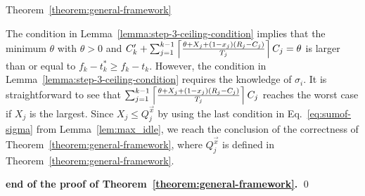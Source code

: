 \begin{appProof}{Theorem~\ref{theorem:general-framework}}

The condition in Lemma~\ref{lemma:step-3-ceiling-condition} implies that the minimum $\theta$ with $\theta > 0$ and
$C_k'+\sum_{j=1}^{k-1} \left\lceil{\frac{\theta+X_j+(1-x_j)(R_j-C_j)}{T_j}}\right\rceil C_j = \theta$
 is larger than or equal to $f_k-t_k^* \geq f_k-t_k$. 
However, the condition in Lemma~\ref{lemma:step-3-ceiling-condition} requires the knowledge of $\sigma_i$. It is straightforward to see that $\sum_{j=1}^{k-1} \left\lceil{\frac{\theta+X_j+(1-x_j)(R_j-C_j)}{T_j}}\right\rceil C_j$ reaches the worst case if $X_j$ is the largest. Since $X_j \leq Q_j^{\vec{x}}$ by using the last condition in Eq.~\eqref{eq:sumof-sigma} from Lemma~\ref{lem:max_idle}, we reach the conclusion of the correctness of Theorem~\ref{theorem:general-framework}, where  $Q_j^{\vec{x}}$ is defined in Theorem~\ref{theorem:general-framework}.

\hfill {\bf end of the proof of Theorem~\ref{theorem:general-framework}.} \qed  


\end{appProof}
